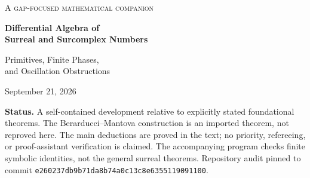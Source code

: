 \documentclass[11pt,letterpaper]{article}
\numberwithin{equation}{section}
\theoremstyle{definition}
\theoremstyle{remark}
\newcommand{\No}{\mathbf{No}}
\newcommand{\mm}{\mathfrak m}
\newcommand{\der}{\partial}
\newcommand{\Repo}{\texttt{VladimirReshetnikov/Surreal}}
\newcommand{\Commit}{\nolinkurl{e260237db9b71da8b74a0c13c8e6355119091100}}
\begin{document}
\begin{titlepage}
\centering
\vspace*{0.45in}
{\large\scshape A gap-focused mathematical companion\par}
\vspace{0.45in}
{\LARGE\bfseries\color{ink} Differential Algebra of\\[0.18em]
Surreal and Surcomplex Numbers\par}
\vspace{0.25in}
{\Large Primitives, Finite Phases,\\[0.15em]and Oscillation Obstructions\par}
\vspace{0.35in}
{\large September 21, 2026\par}
\vspace{0.35in}
\begin{minipage}{0.93\textwidth}
\begin{abstract}
The \Repo\ documentation develops extensive algebraic, analytic, and trigonometric theories while explicitly declining to choose a derivation on the surreal numbers or classify differential-equation solutions. This article supplies that missing interface. Fixing the Berarducci--Mantova derivation $\der$ with $\der\omega=1$, we distinguish differentiation of numbers from differentiation of functions and prove an exact description of the surcomplex logarithmic derivative:
\[
 \left\{\frac{\der z}{z}:z\in\No[i]^{\times}\right\}
   =\No+i\,\der\mm,
\]
where $\mm$ is the class of real infinitesimals. Consequently $\der y=(a+ib)y$ has a nonzero surcomplex solution exactly when $b$ has a finite surreal primitive. A normalized primitive gives an explicit purely infinite obstruction and a complete scalar gauge normal form.

The same criterion identifies the maximal domain of a derivation-compatible surcomplex exponential, classifies all homogeneous constant-coefficient equations, and explains why the harmonic oscillator has no nonzero solution in $\No[i]$. This does not deny canonical global surcomplex exponentials defined by other structural requirements. We also construct exact factorially divergent Hahn-series particular solutions, prove a set-sized differential localization result, and build a minimal differential extension in which oscillation becomes possible.
\end{abstract}
\end{minipage}
\vfill
\begin{minipage}{0.93\textwidth}\small
\textbf{Status.} A self-contained development relative to explicitly stated foundational theorems. The Berarducci--Mantova construction is an imported theorem, not reproved here. The main deductions are proved in the text; no priority, refereeing, or proof-assistant verification is claimed. The accompanying program checks finite symbolic identities, not the general surreal theorems. Repository audit pinned to commit \Commit.
\end{minipage}
\end{titlepage}
\setcounter{page}{2}
\begingroup\small\setlength{\parskip}{0pt}\tableofcontents\endgroup
\clearpage
\end{document}
